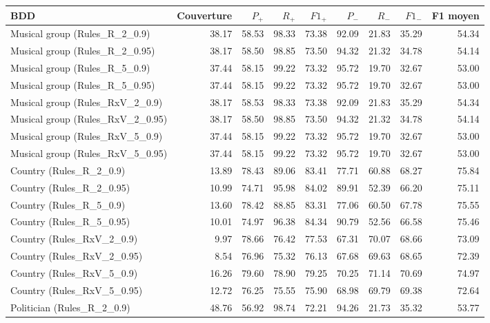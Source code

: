 \begin{table}[htbp]
\centering
\small
\setlength{\tabcolsep}{3pt}
\begin{tabular}{lrrrrrrrr}
\hline
BDD & Couverture & $P_+$ & $R_+$ & $F1_+$ & $P_-$ & $R_-$ & $F1_-$ & F1 moyen \\
\hline
Musical group (Rules\_R\_2\_0.9) & 38.17 & 58.53 & 98.33 & 73.38 & 92.09 & 21.83 & 35.29 & 54.34 \\
Musical group (Rules\_R\_2\_0.95) & 38.17 & 58.50 & 98.85 & 73.50 & 94.32 & 21.32 & 34.78 & 54.14 \\
Musical group (Rules\_R\_5\_0.9) & 37.44 & 58.15 & 99.22 & 73.32 & 95.72 & 19.70 & 32.67 & 53.00 \\
Musical group (Rules\_R\_5\_0.95) & 37.44 & 58.15 & 99.22 & 73.32 & 95.72 & 19.70 & 32.67 & 53.00 \\
Musical group (Rules\_RxV\_2\_0.9) & 38.17 & 58.53 & 98.33 & 73.38 & 92.09 & 21.83 & 35.29 & 54.34 \\
Musical group (Rules\_RxV\_2\_0.95) & 38.17 & 58.50 & 98.85 & 73.50 & 94.32 & 21.32 & 34.78 & 54.14 \\
Musical group (Rules\_RxV\_5\_0.9) & 37.44 & 58.15 & 99.22 & 73.32 & 95.72 & 19.70 & 32.67 & 53.00 \\
Musical group (Rules\_RxV\_5\_0.95) & 37.44 & 58.15 & 99.22 & 73.32 & 95.72 & 19.70 & 32.67 & 53.00 \\
Country (Rules\_R\_2\_0.9) & 13.89 & 78.43 & 89.06 & 83.41 & 77.71 & 60.88 & 68.27 & 75.84 \\
Country (Rules\_R\_2\_0.95) & 10.99 & 74.71 & 95.98 & 84.02 & 89.91 & 52.39 & 66.20 & 75.11 \\
Country (Rules\_R\_5\_0.9) & 13.60 & 78.42 & 88.85 & 83.31 & 77.06 & 60.50 & 67.78 & 75.55 \\
Country (Rules\_R\_5\_0.95) & 10.01 & 74.97 & 96.38 & 84.34 & 90.79 & 52.56 & 66.58 & 75.46 \\
Country (Rules\_RxV\_2\_0.9) & 9.97 & 78.66 & 76.42 & 77.53 & 67.31 & 70.07 & 68.66 & 73.09 \\
Country (Rules\_RxV\_2\_0.95) & 8.54 & 76.96 & 75.32 & 76.13 & 67.68 & 69.63 & 68.65 & 72.39 \\
Country (Rules\_RxV\_5\_0.9) & 16.26 & 79.60 & 78.90 & 79.25 & 70.25 & 71.14 & 70.69 & 74.97 \\
Country (Rules\_RxV\_5\_0.95) & 12.72 & 76.25 & 75.55 & 75.90 & 68.98 & 69.79 & 69.38 & 72.64 \\
Politician (Rules\_R\_2\_0.9) & 48.76 & 56.92 & 98.74 & 72.21 & 94.26 & 21.73 & 35.32 & 53.77 \\

\end{tabular}
\end{table}
